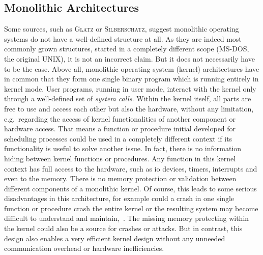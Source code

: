 \subsection{Monolithic Architectures}\label{sec:monolithic-archs}
Some sources, such as \textsc{Glatz}\cite{glatz2015betriebssysteme} or \textsc{Silberschatz}\cite{silberschatz2009operating}, suggest monolithic operating systems do not have a well-defined structure at all. 
As they are indeed most commonly grown structures, started in a completely different scope (MS-DOS, the original UNIX), it is not an incorrect claim.
But it does not necessarily have to be the case.
Above all, monolithic operating system (kernel) architectures have in common that they form one single binary program which is running entirely in kernel mode.
User programs, running in user mode, interact with the kernel only through a well-defined set of \textit{system calls}\cite{lfd430}. 
Within the kernel itself, all parts are free to use and access each other but also the hardware, without any limitation, e.g.\ regarding the access of kernel functionalities of another component or hardware access. 
That means a function or procedure initial developed for scheduling processes could be used in a completely different context if its functionality is useful to solve another issue.
In fact, there is no information hiding between kernel functions or procedures.
Any function in this kernel context has full access to the hardware, such as \ac{io} devices, timers, interrupts and even to the memory. 
There is no memory protection or validation between different components of a monolithic kernel. 
Of course, this leads to some serious disadvantages in this architecture, for example could a crash in one single function or procedure crash the entire kernel or the resulting system may become difficult to understand and maintain\cite{tanenbaum-modern-operating-systems},~\cite{silberschatz2009operating}.
The missing memory protecting within the kernel could also be a source for crashes or attacks.
But in contrast, this design also enables a very efficient kernel design without any unneeded communication overhead or hardware inefficiencies\cite{lfd430}.

